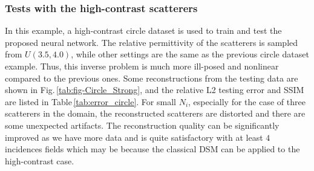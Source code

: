 \documentclass{article}
\begin{document}
  \subsubsection{Tests with the high-contrast scatterers}
  In this example, a high-contrast circle dataset is used to train and test the proposed neural network. The relative permittivity of the scatterers is sampled from $U(3.5,4.0)$, while other settings are the same as the previous circle dataset example. Thus, this inverse problem is much more ill-posed and nonlinear compared to the previous ones. Some reconstructions from the testing data are shown in Fig.\,\ref{tab:fig-Circle_Strong}, and the relative L2 testing error and SSIM are listed in Table\,\ref{tab:error_circle}. For small $N_i$, especially for the case of three scatterers in the domain, the reconstructed scatterers are distorted and there are some unexpected artifacts. The reconstruction quality can be significantly improved as we have more data and is quite satisfactory with at least $4$ incidences fields which may be because the classical DSM can be applied to the high-contrast case.
\end{document}
